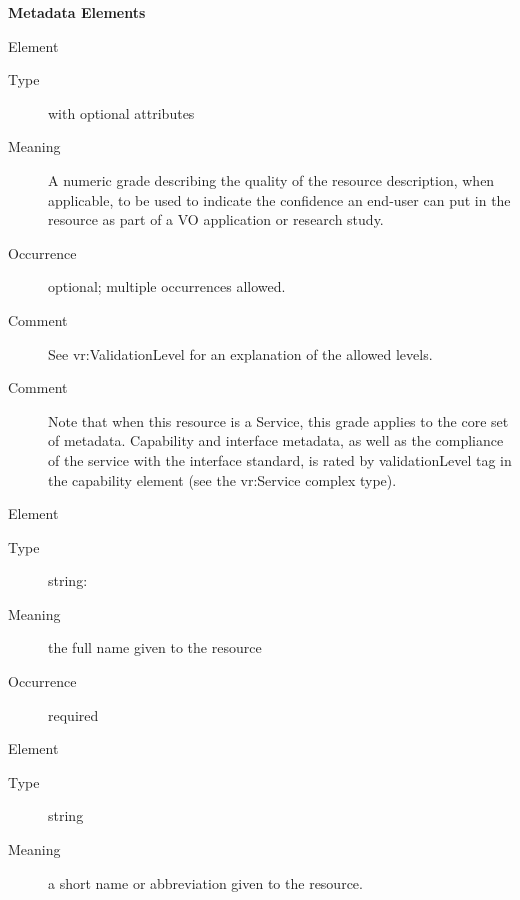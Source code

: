 \documentclass[11pt,a4paper]{ivoa}
\begin{document}
\vspace{0.5ex}\noindent\textbf{ Metadata Elements}

\begingroup\small\begin{bigdescription}\item[Element \xmlel{validationLevel}]
\begin{description}
\item[Type]  with optional attributes
\item[Meaning] 
                  A numeric grade describing the quality of the
                  resource description, when applicable, 
                  to be used to indicate the confidence an end-user
                  can put in the resource as part of a VO application
                  or research study. 
               
\item[Occurrence] optional; multiple occurrences allowed.
\item[Comment] 
                  See vr:ValidationLevel for an explanation of the
                  allowed levels.  
               
\item[Comment] 
                  Note that when this resource is a Service, this
                  grade applies to the core set of metadata.
                  Capability and interface metadata, as well as the
                  compliance of the service with the interface
                  standard, is rated by validationLevel tag in the 
                  capability element (see the vr:Service complex
                  type).  
               

\end{description}
\item[Element \xmlel{title}]
\begin{description}
\item[Type] string: 
\item[Meaning] 
                  the full name given to the resource
               
\item[Occurrence] required

\end{description}
\item[Element \xmlel{shortName}]
\begin{description}
\item[Type] string
\item[Meaning] 
                 a short name or abbreviation given to the resource.
               

\end{description}
\end{bigdescription}
\end{document}
